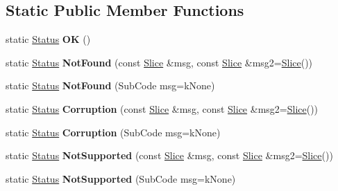\subsection*{Static Public Member Functions}
\begin{DoxyCompactItemize}
\item 
static \hyperlink{classrocksdb_1_1Status}{Status} {\bfseries OK} ()\hypertarget{classrocksdb_1_1Status_aceb84d55ae3b6bccf2a925433ca1ae00}{}\label{classrocksdb_1_1Status_aceb84d55ae3b6bccf2a925433ca1ae00}

\item 
static \hyperlink{classrocksdb_1_1Status}{Status} {\bfseries Not\+Found} (const \hyperlink{classrocksdb_1_1Slice}{Slice} \&msg, const \hyperlink{classrocksdb_1_1Slice}{Slice} \&msg2=\hyperlink{classrocksdb_1_1Slice}{Slice}())\hypertarget{classrocksdb_1_1Status_a415510a7cc15542538c80c790d2bb4af}{}\label{classrocksdb_1_1Status_a415510a7cc15542538c80c790d2bb4af}

\item 
static \hyperlink{classrocksdb_1_1Status}{Status} {\bfseries Not\+Found} (Sub\+Code msg=k\+None)\hypertarget{classrocksdb_1_1Status_a2239b205090bf5dd7123d05b5e3fe39f}{}\label{classrocksdb_1_1Status_a2239b205090bf5dd7123d05b5e3fe39f}

\item 
static \hyperlink{classrocksdb_1_1Status}{Status} {\bfseries Corruption} (const \hyperlink{classrocksdb_1_1Slice}{Slice} \&msg, const \hyperlink{classrocksdb_1_1Slice}{Slice} \&msg2=\hyperlink{classrocksdb_1_1Slice}{Slice}())\hypertarget{classrocksdb_1_1Status_a585d7fbcadd8858734f534519290035d}{}\label{classrocksdb_1_1Status_a585d7fbcadd8858734f534519290035d}

\item 
static \hyperlink{classrocksdb_1_1Status}{Status} {\bfseries Corruption} (Sub\+Code msg=k\+None)\hypertarget{classrocksdb_1_1Status_a9c879b8e364c5defea0dc06bc9863bb1}{}\label{classrocksdb_1_1Status_a9c879b8e364c5defea0dc06bc9863bb1}

\item 
static \hyperlink{classrocksdb_1_1Status}{Status} {\bfseries Not\+Supported} (const \hyperlink{classrocksdb_1_1Slice}{Slice} \&msg, const \hyperlink{classrocksdb_1_1Slice}{Slice} \&msg2=\hyperlink{classrocksdb_1_1Slice}{Slice}())\hypertarget{classrocksdb_1_1Status_affd56b266e377f34a3b2e3d525a9d8c8}{}\label{classrocksdb_1_1Status_affd56b266e377f34a3b2e3d525a9d8c8}

\item 
static \hyperlink{classrocksdb_1_1Status}{Status} {\bfseries Not\+Supported} (Sub\+Code msg=k\+None)\hypertarget{classrocksdb_1_1Status_a3daac74978ea0d4cba97273c4598fc16}{}\label{classrocksdb_1_1Status_a3daac74978ea0d4cba97273c4598fc16}


\end{DoxyCompactItemize}
